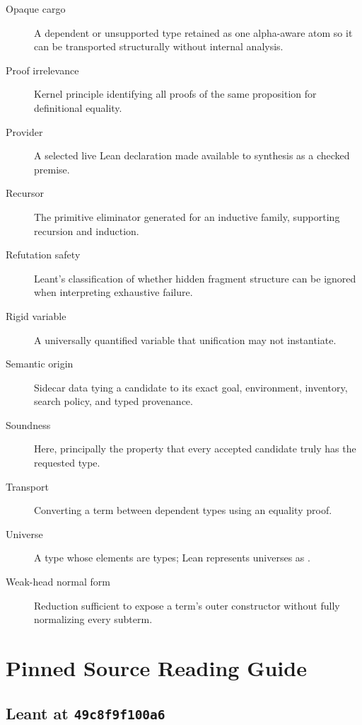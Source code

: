 \documentclass[10pt,letterpaper,oneside,openany]{report}
\newcommand{\term}[1]{\texttt{\detokenize{#1}}}
\newcommand{\LeantCommit}{\texttt{49c8f9f100a6}}
\begin{document}
\begin{description}
\item[Opaque cargo] A dependent or unsupported type retained as one alpha-aware atom so it can be transported structurally without internal analysis.
\item[Proof irrelevance] Kernel principle identifying all proofs of the same proposition for definitional equality.
\item[Provider] A selected live Lean declaration made available to synthesis as a checked premise.
\item[Recursor] The primitive eliminator generated for an inductive family, supporting recursion and induction.
\item[Refutation safety] Leant's classification of whether hidden fragment structure can be ignored when interpreting exhaustive failure.
\item[Rigid variable] A universally quantified variable that unification may not instantiate.
\item[Semantic origin] Sidecar data tying a candidate to its exact goal, environment, inventory, search policy, and typed provenance.
\item[Soundness] Here, principally the property that every accepted candidate truly has the requested type.
\item[Transport] Converting a term between dependent types using an equality proof.
\item[Universe] A type whose elements are types; Lean represents universes as \term{Sort u}.
\item[Weak-head normal form] Reduction sufficient to expose a term's outer constructor without fully normalizing every subterm.
\end{description}

\chapter{Pinned Source Reading Guide}\label{app:sources}

\section{Leant at \LeantCommit}
\end{document}
